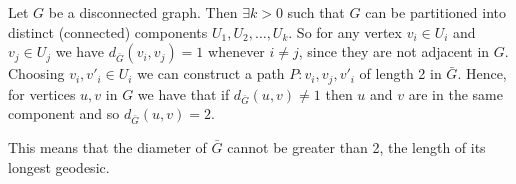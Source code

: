 Let $G$ be a disconnected graph. Then $\exists k > 0$ such that $G$ can be partitioned
into distinct (connected) components $U_1, U_2, \dots ,U_k$. So for any vertex $v_i \in U_i$ 
and $v_j \in U_j$ we have $d_{\bar{G}}\left(v_i, v_j\right) = 1$  whenever $ i \neq j$, since they are not adjacent
in $G$. Choosing $v_i , v'_i \in U_i$ we can construct a path $P: v_i, v_j, v'_i$ of length 2 in 
$\bar{G}$. Hence, for vertices $u,v$ in $G$ we have that if $d_{\bar{G}}\left(u,v\right) \neq 1$  then $u$ and $v$ are
in the same component and so $d_{\bar{G}}\left(u,v\right) = 2$.

This means that the diameter of $\bar{G}$ cannot be greater than 2,
the length of its longest geodesic.
